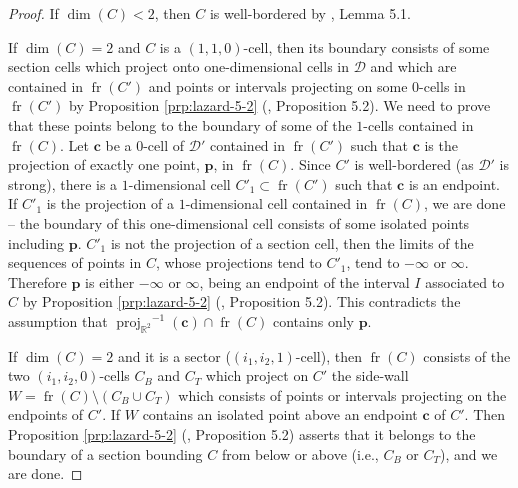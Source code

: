 \documentclass[
]{book}
\theoremstyle{definition}
\theoremstyle{definition}
\theoremstyle{definition}
\theoremstyle{definition}
\theoremstyle{remark}
\begin{document}
\begin{proof}
If \(\dim(C) < 2\), then \(C\) is well-bordered by \citet{lazard10}, Lemma 5.1.

If \(\dim(C) = 2\) and \(C\) is a \((1,1,0)\)-cell, then its boundary consists of some section cells which project onto one-dimensional cells in \(\mathcal{D}\) and which are contained in \({\operatorname{fr} \left( C' \right)}\) and points or intervals projecting on some \(0\)-cells in \({\operatorname{fr} \left( C' \right)}\) by Proposition \ref{prp:lazard-5-2} (\citet{lazard10}, Proposition 5.2).
We need to prove that these points belong to the boundary of some of the \(1\)-cells contained in \({\operatorname{fr} \left( C \right)}\).
Let \(\mathbf{c}\) be a \(0\)-cell of \(\mathcal{D'}\) contained in \({\operatorname{fr} \left( C' \right)}\) such that \(\mathbf{c}\) is the projection of exactly one point, \(\mathbf{p}\), in \({\operatorname{fr} \left( C \right)}\).
Since \(C'\) is well-bordered (as \(\mathcal{D'}\) is strong), there is a \(1\)-dimensional cell \(C'_1 \subset {\operatorname{fr} \left( C' \right)}\) such that \(\mathbf{c}\) is an endpoint.
If \(C'_1\) is the projection of a \(1\)-dimensional cell contained in \({\operatorname{fr} \left( C \right)}\), we are done -- the boundary of this one-dimensional cell consists of some isolated points including \(\mathbf{p}\).
\(C'_1\) is not the projection of a section cell, then the limits of the sequences of points in \(C\), whose projections tend to \(C'_1\), tend to \(-\infty\) or \(\infty\). Therefore \(\mathbf{p}\) is either \(-\infty\) or \(\infty\), being an endpoint of the interval \(I\) associated to \(C\) by Proposition \ref{prp:lazard-5-2} (\citet{lazard10}, Proposition 5.2). This contradicts the assumption that \({\operatorname{proj}_{\mathbb{R}^{2}}}^{-1}(\mathbf{c}) \cap {\operatorname{fr} \left( C \right)}\) contains only \(\mathbf{p}\).

If \(\dim(C) = 2\) and it is a sector (\((i_1,i_2,1)\)-cell), then \({\operatorname{fr} \left( C \right)}\) consists of the two \((i_1,i_2,0)\)-cells \(C_B\) and \(C_T\) which project on \(C'\) the side-wall \(W = {\operatorname{fr} \left( C \right)} \setminus (C_B \cup C_T)\) which consists of points or intervals projecting on the endpoints of \(C'\).
If \(W\) contains an isolated point above an endpoint \(\mathbf{c}\) of \(C'\). Then Proposition \ref{prp:lazard-5-2} (\citet{lazard10}, Proposition 5.2) asserts that it belongs to the boundary of a section bounding \(C\) from below or above (i.e., \(C_B\) or \(C_T\)), and we are done.


\end{proof}
\end{document}
